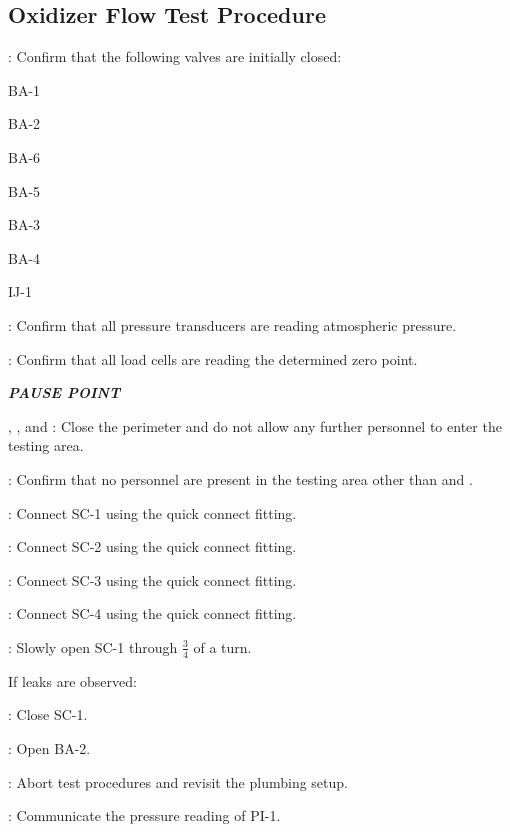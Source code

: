 \subsection{Oxidizer Flow Test Procedure}
\begin{checklist}
    \item \primary{}: Confirm that the following valves are initially closed:
    \begin{checklist}
		\item BA-1
        \item BA-2
        \item BA-6
        \item BA-5
		\item BA-3
		\item BA-4
		\item IJ-1
    \end{checklist}
    \item \daq{}: Confirm that all pressure transducers are reading atmospheric pressure.
    \item \daq{}: Confirm that all load cells are reading the determined zero point.
    \item \textbf{\textit{PAUSE POINT}}
    \item \peri{}, \perii{}, and \periii{}: Close the perimeter and do not allow any further personnel to enter the testing area.
    \item \secondary: Confirm that no personnel are present in the testing area other than \primary{} and \secondary.
    \item \primary{}: Connect SC-1 using the quick connect fitting.
    \item \primary{}: Connect SC-2 using the quick connect fitting.
    \item \primary{}: Connect SC-3 using the quick connect fitting.
    \item \primary{}: Connect SC-4 using the quick connect fitting.
    \item \primary{}: Slowly open SC-1 through $\frac{3}{4}$ of a turn.
    \item If leaks are observed:
    \begin{checklist}
            \item \primary{}: Close SC-1. 
            \item \primary{}: Open BA-2. 
            \item \ops{}: Abort test procedures and revisit the plumbing setup. 
    \end{checklist}
    \item \primary{}: Communicate the pressure reading of PI-1.

\end{checklist}
